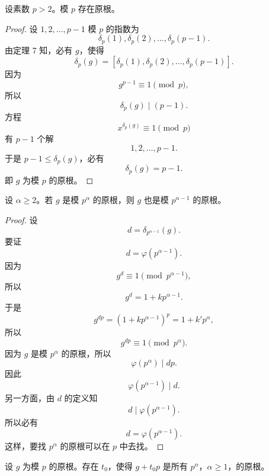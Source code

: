 \begin{lemma}[原文 引理 1]
	设素数 $p>2$。模 $p$ 存在原根。
\end{lemma}

\begin{proof}
	设 $1,2,\ldots,p-1$ 模 $p$ 的指数为
	\[
		\delta_p(1),\delta_p(2),\ldots,\delta_p(p-1).
	\]
	由定理 7 知，必有 $g$，使得
	\[
		\delta_p(g)=[\delta_p(1),\delta_p(2),\ldots,\delta_p(p-1)].
	\]
	因为
	\[
		g^{p-1}\equiv 1\pmod p,
	\]
	所以
	\[
		\delta_p(g)\mid (p-1).
	\]
	方程
	\[
		x^{\delta_p(g)}\equiv 1\pmod p
	\]
	有 $p-1$ 个解
	\[
		1,2,\ldots,p-1.
	\]
	于是 $p-1\leq \delta_p(g)$，必有
	\[
		\delta_p(g)=p-1.
	\]
	即 $g$ 为模 $p$ 的原根。
\end{proof}

\begin{lemma}[原文 引理 2]
	设 $\alpha\geq 2$。若 $g$ 是模 $p^\alpha$ 的原根，则 $g$ 也是模 $p^{\alpha-1}$ 的原根。
\end{lemma}

\begin{proof}
	设
	\[
		d=\delta_{p^{\alpha-1}}(g).
	\]
	要证
	\[
		d=\varphi(p^{\alpha-1}).
	\]
	因为
	\[
		g^d\equiv 1\pmod {p^{\alpha-1}},
	\]
	所以
	\[
		g^d=1+kp^{\alpha-1}.
	\]
	于是
	\[
		g^{dp}=(1+kp^{\alpha-1})^p=1+k'p^\alpha,
	\]
	所以
	\[
		g^{dp}\equiv 1\pmod {p^\alpha}.
	\]
	因为 $g$ 是模 $p^\alpha$ 的原根，所以
	\[
		\varphi(p^\alpha)\mid dp.
	\]
	因此
	\[
		\varphi(p^{\alpha-1})\mid d.
	\]
	另一方面，由 $d$ 的定义知
	\[
		d\mid \varphi(p^{\alpha-1}).
	\]
	所以必有
	\[
		d=\varphi(p^{\alpha-1}).
	\]
	这样，要找 $p^\alpha$ 的原根可以在 $p$ 中去找。
\end{proof}

\begin{lemma}[原文 引理 3]
	设 $g$ 为模 $p$ 的原根。存在 $t_0$，使得 $g+t_0p$ 是所有 $p^\alpha$，$\alpha\geq 1$，的原根。
\end{lemma}

